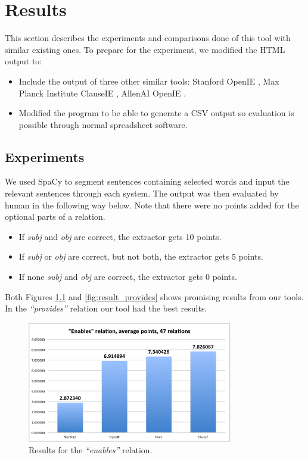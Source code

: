 \documentclass[11pt,a4paper,openright]{memoir}
\begin{document}
%
%
%
%

\chapter{Results}
\label{chapter:results}

This section describes the experiments and comparisons done of this tool with similar existing ones. To prepare for the experiment, we modified the HTML output to:
	\begin{itemize}
	  \item Include the output of three other similar tools: Stanford OpenIE \cite{angeli-johnsonpremkumar-manning:2015:ACL-IJCNLP}, Max Planck Institute ClauseIE \cite{DelCorro:2013:CCO:2488388.2488420}, AllenAI OpenIE \cite{Etzioni:2011:OIE:2283396.2283398}.
	  \item Modified the program to be able to generate a CSV output so evaluation is possible through normal spreadsheet software.
	\end{itemize}


\section{Experiments}

We used SpaCy to segment sentences containing selected words and input the relevant sentences through each system. The output was then evaluated by human in the following way below. Note that there were no points added for the optional parts of a relation.

\begin{itemize}
  \item If \emph{subj} and \emph{obj} are correct, the extractor gets 10 points.
  \item If \emph{subj} or \emph{obj} are correct, but not both, the extractor gets 5 points.
  \item If none \emph{subj} and \emph{obj} are correct, the extractor gets 0 points.
\end{itemize}

Both Figures \ref{fig:result_enables} and \ref{fig:result_provides} shows promising results from our tools. In the \emph{\enquote{provides}} relation our tool had the best results.

\begin{figure}[!htbp]
  \centering
    \includegraphics[width=0.8\textwidth]{./images/image001}
  \caption[Results for the \emph{\enquote{enables}} relation.]{Results for the \emph{\enquote{enables}} relation.}
  \label{fig:result_enables}
\end{figure}
\end{document}
